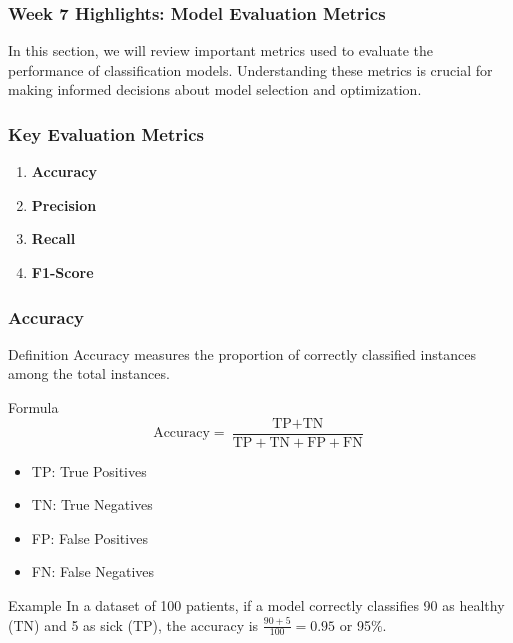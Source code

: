 \documentclass[aspectratio=169]{beamer}
\begin{document}
\begin{frame}[fragile]
    \frametitle{Week 7 Highlights: Model Evaluation Metrics}
    In this section, we will review important metrics used to evaluate the performance of classification models. Understanding these metrics is crucial for making informed decisions about model selection and optimization.
\end{frame}

\begin{frame}[fragile]
    \frametitle{Key Evaluation Metrics}
    \begin{enumerate}
        \item \textbf{Accuracy}
        \item \textbf{Precision}
        \item \textbf{Recall}
        \item \textbf{F1-Score}
    \end{enumerate}
\end{frame}

\begin{frame}[fragile]
    \frametitle{Accuracy}
    \begin{block}{Definition}
        Accuracy measures the proportion of correctly classified instances among the total instances.
    \end{block}
    \begin{block}{Formula}
        \begin{equation}
            \text{Accuracy} = \frac{\text{TP} + \text{TN}}{\text{TP} + \text{TN} + \text{FP} + \text{FN}}
        \end{equation}
    \end{block}
    \begin{itemize}
        \item TP: True Positives
        \item TN: True Negatives
        \item FP: False Positives
        \item FN: False Negatives
    \end{itemize}
    \begin{block}{Example}
        In a dataset of 100 patients, if a model correctly classifies 90 as healthy (TN) and 5 as sick (TP), 
        the accuracy is \( \frac{90 + 5}{100} = 0.95 \) or 95\%.
    \end{block}
\end{frame}
\end{document}

